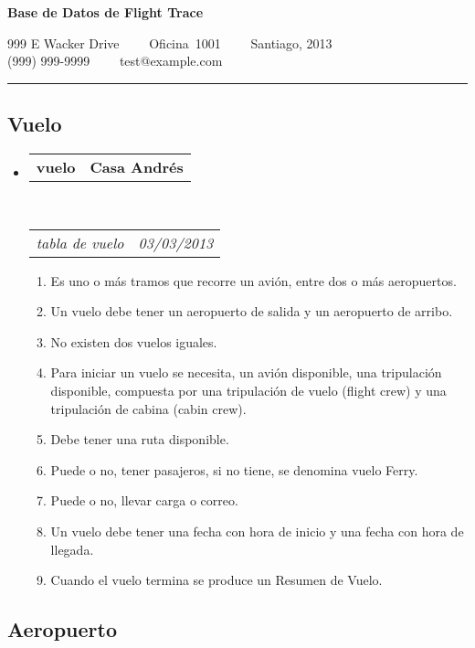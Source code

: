 \documentclass[10pt,letterpaper]{article}
\makeatletter
\newcommand{\headerrow}[2]
{\begin{tabular*}{\linewidth}{l@{\extracolsep{\fill}}r}
	#1 &
	#2 \\
\end{tabular*}}
\makeatother
\begin{document}
\begin{center}
{\LARGE \textbf{Base de Datos de Flight Trace}}

999 E Wacker Drive\ \ \textbullet
\ \ Oficina\ 1001\ \ \textbullet
\ \ Santiago, 2013
\\
(999) 999-9999\ \ \textbullet
\ \ test@example.com
\end{center}

\hrule
\vspace{-0.4em}

\subsection*{Vuelo}

\begin{itemize}
	\parskip=0.1em

	\item
	\headerrow
		{\textbf{vuelo}}
		{\textbf{Casa Andrés}}
	\\
	\headerrow
		{\emph{tabla de vuelo}}
		{\emph{03/03/2013}}
	\begin{enumerate}
		\item Es uno o más tramos que recorre un avión, entre dos o más aeropuertos.
		\item Un vuelo debe tener un aeropuerto de salida y un aeropuerto de arribo.
		\item No existen dos vuelos iguales.
		\item Para iniciar un vuelo se necesita, un avión disponible, una tripulación disponible, compuesta por una tripulación de vuelo (flight crew) y una tripulación de cabina (cabin crew).
		\item Debe tener una ruta disponible.
		\item Puede o no, tener pasajeros, si no tiene, se denomina vuelo Ferry.
		\item Puede o no, llevar carga o correo.
		\item Un vuelo debe tener una fecha con hora de inicio y una fecha con hora de llegada.
		\item Cuando el vuelo termina se produce un Resumen de Vuelo.
	\end{enumerate}

\end{itemize}

\subsection*{Aeropuerto}
\end{document}
